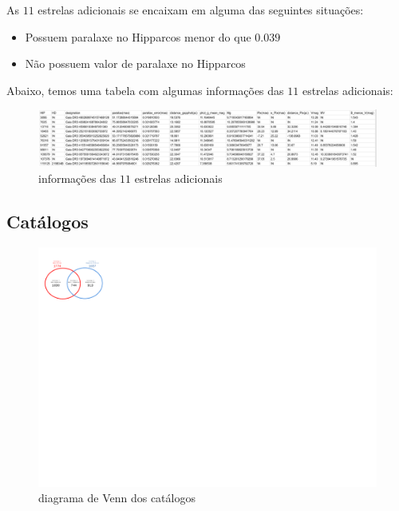 \documentclass{article}
\begin{document}
\begin{enumerate}
	    As $11$ estrelas adicionais se encaixam em alguma das seguintes situações:
		
		\begin{itemize}
			\item Possuem paralaxe no Hipparcos menor do que $0.039$\textquotesingle \textquotesingle
			\item Não possuem valor de paralaxe no Hipparcos
		\end{itemize}
	
		Abaixo, temos uma tabela com algumas informações das $11$ estrelas adicionais:

		\hspace{20pt}		

		\begin{figure}[h]
			\centering
			\includegraphics[width=.98\linewidth]{dados_onze_estrelas.png}
			\caption*{informações das $11$ estrelas adicionais}
		\end{figure}


		
	\end{enumerate}

	\newpage
	\begin{center}
		\section*{\small Catálogos}
	\end{center}
	\vspace{50pt}	
	
	
	\begin{figure}[h]
		\centering
		\includegraphics[width=\textwidth, trim = 0cm 16.4cm 23cm 1.1cm, clip]{catalogues.pdf}
		\caption*{diagrama de Venn dos catálogos}
	\end{figure}
	
\end{document}
